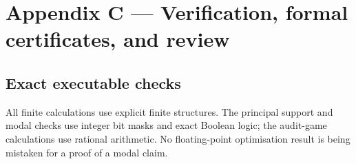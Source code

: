 \documentclass[11pt,a4paper]{article}
\begin{document}

\section*{Appendix C --- Verification, formal certificates, and
review}\label{appendix-c-verification-formal-certificates-and-review}

\subsection*{Exact executable checks}\label{exact-executable-checks}

All finite calculations use explicit finite structures. The principal
support and modal checks use integer bit masks and exact Boolean logic;
the audit-game calculations use rational arithmetic. No floating-point
optimisation result is being mistaken for a proof of a modal claim.
\end{document}
